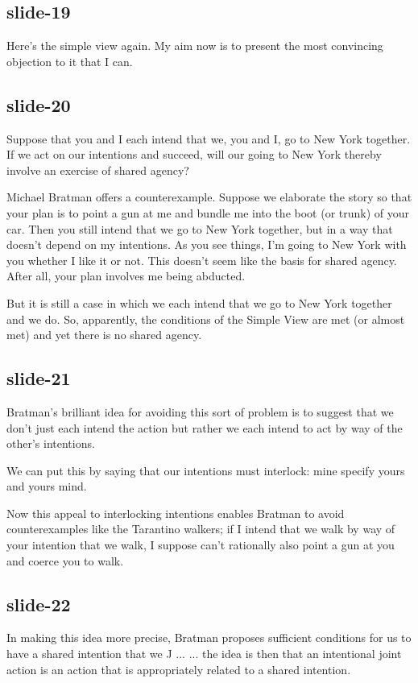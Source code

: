 \documentclass[12pt,\papersize]{extarticle}
\begin{document}
\subsection{slide-19}
Here’s the simple view again.  My aim now is to present the most convincing objection
to it that I can.

\subsection{slide-20}
Suppose that you and I each intend that we, you and I, go to New York together.
If we act on our intentions and succeed, will our going to New York thereby
involve an exercise of shared agency?

Michael Bratman offers a counterexample.  Suppose we elaborate the story so
that your plan is to point a gun at me and bundle me into the boot (or trunk) of your car.
Then you still intend that we go to New York together, but in a way that doesn't
depend on my intentions.  As you see things, I'm going to New York with you whether
I like it or not.  This doesn't seem like the basis for shared agency.
After all, your plan involves me being abducted.

But it is still a case in which we each intend that we go to New York together and we do.
So, apparently, the conditions of the Simple View are met (or almost met) and yet there is
no shared agency.

\subsection{slide-21}
Bratman’s brilliant idea for avoiding this sort of problem is to suggest that we don’t just each intend the action but rather we each intend to act by way of the other's intentions.

We can put this by saying that our intentions must interlock: mine specify yours and yours mind.

Now this appeal to interlocking intentions enables Bratman to avoid counterexamples like the Tarantino walkers; if I intend that we walk by way of your intention that we walk, I suppose can't rationally also point a gun at you and coerce you to walk.

\subsection{slide-22}
In making this idea more precise, Bratman proposes sufficient conditions for us to have
a shared intention that we J ...
... the idea is then that an intentional joint action is an action that is appropriately
related to a shared intention.
\end{document}
